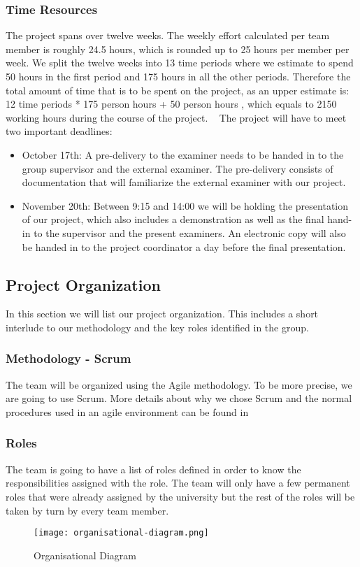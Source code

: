\documentclass[../document.tex]{subfiles}
\begin{document}
\subsubsection{Time Resources}
The project spans over twelve weeks. The weekly effort calculated per team member is roughly 24.5 hours, which is rounded up to 25 hours per member per week. We split the twelve weeks into 13 time periods where we estimate to spend 50 hours in the first period and 175 hours in all the other periods. Therefore the total amount of time that is to be spent on the project, as an upper estimate is: 12 time periods * 175 person hours + 50 person hours , which equals to 2150 working hours during the course of the project.
\newline \ \newline
The project will have to meet two important deadlines:
\begin{itemize}
\item
October 17th: A pre-delivery to the examiner needs to be handed in to the group supervisor and the external examiner. The pre-delivery consists of documentation that will familiarize the external examiner with our project.
\item
November 20th: Between 9:15 and 14:00 we will be holding the presentation of our project, which also includes a demonstration as well as the final hand-in to the supervisor and the present examiners. An electronic copy will also be handed in to the project coordinator a day before the final presentation.
\end{itemize}

\subsection{Project Organization}
In this section we will list our project organization. This includes a short interlude to our methodology and the key roles identified in the group.

\subsubsection{Methodology - Scrum}
The team will be organized using the Agile methodology. To be more precise, we are going to use Scrum. More details about why we chose Scrum and the normal procedures used in an agile environment can be found in 

\subsubsection{Roles}
The team is going to have a list of roles defined in order to know the responsibilities assigned with the role. The team will only have a few permanent roles that were already assigned by the university but the rest of the roles will be taken by turn by every team member. 
\begin{figure}
\centering
\texttt{[image: organisational-diagram.png]}
\caption{Organisational Diagram}
\end{figure}
\end{document}
